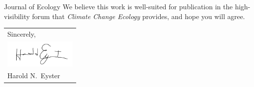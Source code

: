 \documentclass[11pt]{article}
\begin{document}
Journal of Ecology
	We believe this work is well-suited for publication in the high-visibility forum that \textit{Climate Change Ecology} provides, and hope you will agree. \\  %
	\null\hfill
	\begin{tabular}{l@{}}
		Sincerely, \\[1\normalbaselineskip] %
		\includegraphics[width=100pt]{sig}\\
		Harold N.\ Eyster
	\end{tabular}
	
\end{document}
